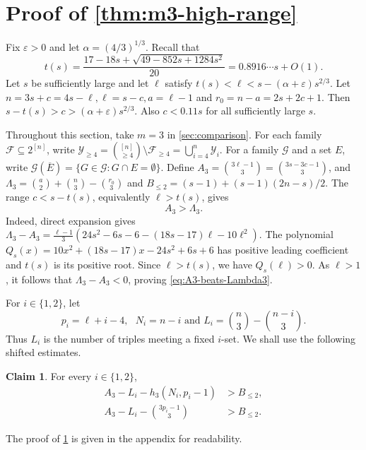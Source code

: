 \documentclass[10pt,a4paper]{article}
\numberwithin{equation}{section}
\theoremstyle{definition}
\newtheorem{claim}[claim]{Claim}
\newcommand{\F}{\mathcal F}
\newcommand{\G}{\mathcal G}
\newcommand{\Y}{\mathcal Y}
\begin{document}
\section{Proof of \cref{thm:m3-high-range}}\label{sec:m3-high}

Fix $\varepsilon>0$ and let $\alpha=(4/3)^{1/3}$.
Recall that
\[
        t(s)=\frac{17-18s+\sqrt{49-852s+1284s^2}}{20}= 0.8916\cdots s+O(1).
\]
Let $s$ be sufficiently large and let $\ell$ satisfy $t(s)<\ell<s-(\alpha+\varepsilon)s^{2/3}$.
Let $n=3s+c=4s-\ell,\ell=s-c,a=\ell-1$ and $r_0=n-a=2s+2c+1$.
Then $s-t(s)>c>(\alpha+\varepsilon)s^{2/3}$.
Also $c<0.11s$ for all sufficiently large $s$.

Throughout this section, take $m=3$ in \cref{sec:comparison}.
For each family $\F\subseteq2^{[n]}$, write $\Y_{\ge4}=\binom{[n]}{\ge4}\setminus\F_{\ge4}=\bigcup_{i=4}^n\Y_i$.
For a family $\G$ and a set $E$, write $\G(\overline E)=\{G\in\G:G\cap E=\emptyset\}$.
Define $A_3=\binom{3\ell-1}{3}=\binom{3s-3c-1}{3}$, and $\Lambda_3=\binom a2+\binom n3-\binom{r_0}{3}$ and $B_{\le2}=(s-1)+(s-1)(2n-s)/2$.
The range $c<s-t(s)$, equivalently $\ell>t(s)$, gives
\begin{equation}\label{eq:A3-beats-Lambda3}
        A_3>\Lambda_3.
\end{equation}
Indeed, direct expansion gives $\Lambda_3-A_3=
        \frac{\ell-1}{3}
        \left(24s^2-6s-6-(18s-17)\ell-10\ell^2\right)$.
The polynomial $Q_s(x)=10x^2+(18s-17)x-24s^2+6s+6$ has positive leading coefficient and $t(s)$ is its positive root.
Since $\ell>t(s)$, we have $Q_s(\ell)>0$. As $\ell>1$, it follows that $\Lambda_3-A_3<0$, proving \eqref{eq:A3-beats-Lambda3}.



For $i\in\{1,2\}$, let
\begin{equation}\label{eq:m3-pi-Ni-Li}
        p_i=\ell+i-4, \text{ }
        N_i=n-i \text{ and }
        L_i=\binom n3-\binom{n-i}3.
\end{equation}
Thus $L_i$ is the number of triples meeting a fixed $i$-set.
We shall use the following shifted estimates.
\begin{claim}\label{clm:m3-shifted-estimates}
        For every $i\in\{1,2\}$,
        \begin{align}
                A_3-L_i-h_3(N_i,p_i-1)    & >B_{\le2}, \label{eq:m3-shifted-h3}     \\
                A_3-L_i-\binom{3p_i-1}{3} & >B_{\le2}. \label{eq:m3-shifted-clique}
        \end{align}
\end{claim}
The proof of \cref{clm:m3-shifted-estimates} is given in the appendix for readability.
\end{document}
